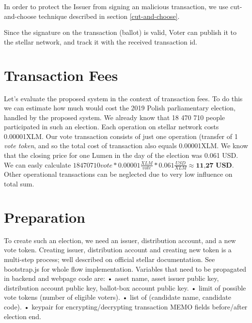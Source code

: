 \documentclass[runningheads]{llncs}
\begin{document}
In order to protect the Issuer from signing an malicious transaction, we use cut-and-choose technique described in section \ref{cut-and-choose}.

Since the signature on the transaction (ballot) is valid, Voter can publish it to the stellar network, and track it with the received transaction id.


\section{Transaction Fees}
Let’s evaluate the proposed system in the context of transaction fees. To do this we can estimate how much would cost the 2019 Polish parliamentary election, handled by the proposed system. We already know that 18 470 710 people participated in such an election. Each operation on stellar network costs 0.00001XLM. Our vote transaction consists of just one operation (transfer of 1 \textit{vote token}, and so the total cost of transaction also equals 0.00001XLM. We know that the closing price for one Lumen in the day of the election was 0.061 USD. We can easly calculate \(18470710 vote * 0.00001 \frac{XLM}{vote} * 0.061 \frac{USD}{XLM} \approx \textbf{11,27 USD}\). Other operational transactions can be neglected due to very low influence on total sum.

\section{Preparation}
To create such an election, we need an issuer, distribution account, and a new vote token. Creating issuer, distribution account and creating new token is a multi-step process; well described on official stellar documentation. See bootstrap.js for whole flow implementation. Variables that need to be propagated in backend and webpage code are:
• asset name, asset issuer public key, distribution account public key, ballot-box account public key.
• limit of possible vote tokens (number of eligible voters). 
• list of (candidate name, candidate code).
• keypair for encrypting/decrypting transaction MEMO fields before/after election end.
\end{document}
